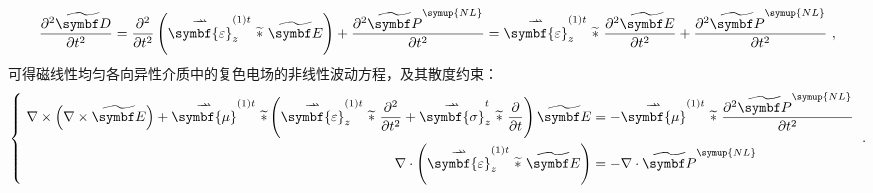 \begin{equation} \label{eq:2-12}
	\frac{\partial^2 \widetilde{\symbf D}}{\partial t^2} = \frac{\partial^2 }{\partial t^2} \left( \overset{\rightharpoonup\!\!\!\! \rightharpoonup}{\symbf{\varepsilon}}^{(1)t}_{z}\ \widetilde *\ \widetilde{\symbf E} \right) + \frac{\partial^2 \widetilde{\symbf P}^{{\symup{NL}}}}{\partial t^2} = \overset{\rightharpoonup\!\!\!\! \rightharpoonup}{\symbf{\varepsilon}}^{(1)t}_{z}\ \widetilde *\ \frac{\partial^2 \widetilde{\symbf E}}{\partial t^2} + \frac{\partial^2 \widetilde{\symbf P}^{{\symup{NL}}}}{\partial t^2} ~,
\end{equation}
可得磁线性均匀各向异性介质中的复色电场的非线性波动方程，及其散度约束：
\begin{equation} \label{eq:2-13}
    \abovedisplayshortskip=0pt
	\abovedisplayskip=0pt
    \belowdisplayshortskip=0pt
    \belowdisplayskip=0pt
	\left\{\ \begin{aligned} \nabla \times \left( \nabla \times \widetilde{\symbf E} \right) + \overset{\rightharpoonup\!\!\!\! \rightharpoonup}{\symbf{\mu}}^{(1)t}\ \widetilde * \left( \overset{\rightharpoonup\!\!\!\! \rightharpoonup}{\symbf{\varepsilon}}^{(1)t}_{z}\ \widetilde *\ \displaystyle{\frac{\partial^2 }{\partial t^2}} + \overset{\rightharpoonup\!\!\!\! \rightharpoonup}{\symbf{\sigma}}^{t}_{z}\ \widetilde *\ \displaystyle{\frac{\partial }{\partial t}} \right) \widetilde{\symbf E} &= - \overset{\rightharpoonup\!\!\!\! \rightharpoonup}{\symbf{\mu}}^{(1)t}\ \widetilde *\  \displaystyle{\frac{\partial^2 \widetilde{\symbf P}^{{\symup{NL}}}}{\partial t^2}} \\ \nabla \cdot \left( \overset{\rightharpoonup\!\!\!\! \rightharpoonup}{\symbf{\varepsilon}}^{(1)t}_{z}\ \widetilde *\ \widetilde{\symbf E} \right) &= - \nabla \cdot \widetilde{\symbf P}^{{\symup{NL}}} \end{aligned}\right. ~.
\end{equation}

